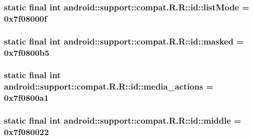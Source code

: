 \hypertarget{classandroid_1_1support_1_1compat_1_1_r_1_1id_cf4d038e7042a03c959cace3fc19bef3}{
\subsubsection[{listMode}]{\setlength{\rightskip}{0pt plus 5cm}static final int android::support::compat.R.R::id::listMode = 0x7f08000f}}
\label{classandroid_1_1support_1_1compat_1_1_r_1_1id_cf4d038e7042a03c959cace3fc19bef3}


\hypertarget{classandroid_1_1support_1_1compat_1_1_r_1_1id_e540b570a4352809c34471508f426485}{
\subsubsection[{masked}]{\setlength{\rightskip}{0pt plus 5cm}static final int android::support::compat.R.R::id::masked = 0x7f0800b5}}
\label{classandroid_1_1support_1_1compat_1_1_r_1_1id_e540b570a4352809c34471508f426485}


\hypertarget{classandroid_1_1support_1_1compat_1_1_r_1_1id_62454adb4798d1c15dbb19cbb5ff7896}{
\subsubsection[{media\_\-actions}]{\setlength{\rightskip}{0pt plus 5cm}static final int android::support::compat.R.R::id::media\_\-actions = 0x7f0800a1}}
\label{classandroid_1_1support_1_1compat_1_1_r_1_1id_62454adb4798d1c15dbb19cbb5ff7896}


\hypertarget{classandroid_1_1support_1_1compat_1_1_r_1_1id_8781652692929c78006ea496db268d31}{
\subsubsection[{middle}]{\setlength{\rightskip}{0pt plus 5cm}static final int android::support::compat.R.R::id::middle = 0x7f080022}}
\label{classandroid_1_1support_1_1compat_1_1_r_1_1id_8781652692929c78006ea496db268d31}


